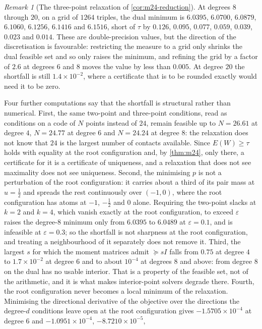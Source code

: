 \documentclass[11pt,reqno]{amsart}
\renewcommand{\_}{\origunderscore\allowbreak}
\numberwithin{equation}{section}
\theoremstyle{plain}
\theoremstyle{definition}
\theoremstyle{remark}
\newtheorem{remark}[thm]{Remark}
\begin{document}
\begin{remark}[The three-point relaxation of \cref{cor:m24-reduction}]
At degrees $8$ through $20$, on a grid of $1264$ triples, the dual
minimum is $6.0395$, $6.0700$, $6.0879$, $6.1060$, $6.1256$, $6.1416$
and $6.1516$, short of $\tau$ by $0.126$, $0.095$, $0.077$, $0.059$,
$0.039$, $0.023$ and $0.014$. These are double-precision values, but the
direction of the discretisation is favourable: restricting the measure
to a grid only shrinks the dual feasible set and so only raises the
minimum, and refining the grid by a factor of $2.6$ at degrees $6$ and
$8$ moves the value by less than $0.005$. At degree $20$ the shortfall
is still $1.4\times10^{-2}$, where a certificate that is to be rounded
exactly would need it to be zero.

Four further computations say that the shortfall is structural rather
than numerical. First, the same two-point and three-point conditions,
read as conditions on a code of $N$ points instead of $24$, remain
feasible up to $N=26.61$ at degree $4$, $N=24.77$ at degree $6$ and
$N=24.24$ at degree $8$: the relaxation does not know that $24$ is the
largest number of contacts available. Since $E(W)\ge\tau$ holds with
equality at the root configuration and, by \cref{thm:m24}, only there,
a certificate for it is a certificate of uniqueness, and a relaxation
that does not see maximality does not see uniqueness. Second, the
minimising $p$ is not a perturbation of the root configuration: it
carries about a third of its pair mass at $u=\tfrac12$ and spreads the
rest continuously over $(-1,0)$, where the root configuration has atoms
at $-1$, $-\tfrac12$ and $0$ alone. Requiring the two-point slacks at
$k=2$ and $k=4$, which vanish exactly at the root configuration, to
exceed $\varepsilon$ raises the degree-$8$ minimum only from $6.0395$ to
$6.0489$ at $\varepsilon=0.1$, and is infeasible at $\varepsilon=0.3$;
so the shortfall is not sharpness at the root configuration, and
treating a neighbourhood of it separately does not remove it. Third,
the largest $s$ for which the moment matrices admit $\succeq sI$ falls
from $0.75$ at degree $4$ to $1.7\times10^{-2}$ at degree $6$ and to
about $10^{-4}$ at degrees $8$ and above: from degree $8$ on the dual
has no usable interior. That is a property of the feasible set, not of
the arithmetic, and it is what makes interior-point solvers degrade
there. Fourth, the root configuration never becomes a local minimum of
the relaxation. Minimising the directional derivative of the objective
over the directions the degree-$d$ conditions leave open at the root
configuration gives $-1.5705\times10^{-4}$ at degree $6$ and
$-1.0951\times10^{-4}$, $-8.7210\times10^{-5}$,

\end{remark}
\end{document}
